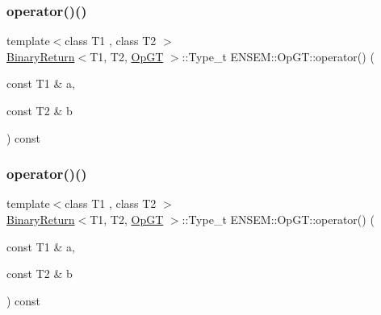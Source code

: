\subsubsection{\texorpdfstring{operator()()}{operator()()}\hspace{0.1cm}{\footnotesize\ttfamily [1/3]}}
{\footnotesize\ttfamily template$<$class T1 , class T2 $>$ \\
\mbox{\hyperlink{structENSEM_1_1BinaryReturn}{Binary\+Return}}$<$T1, T2, \mbox{\hyperlink{structENSEM_1_1OpGT}{Op\+GT}} $>$\+::Type\+\_\+t E\+N\+S\+E\+M\+::\+Op\+G\+T\+::operator() (\begin{DoxyParamCaption}\item[{const T1 \&}]{a,  }\item[{const T2 \&}]{b }\end{DoxyParamCaption}) const\hspace{0.3cm}{\ttfamily [inline]}}

\mbox{\label{structENSEM_1_1OpGT_acc420fbf856bae16d2db09a4c622ff4f}} 
\subsubsection{\texorpdfstring{operator()()}{operator()()}\hspace{0.1cm}{\footnotesize\ttfamily [2/3]}}
{\footnotesize\ttfamily template$<$class T1 , class T2 $>$ \\
\mbox{\hyperlink{structENSEM_1_1BinaryReturn}{Binary\+Return}}$<$T1, T2, \mbox{\hyperlink{structENSEM_1_1OpGT}{Op\+GT}} $>$\+::Type\+\_\+t E\+N\+S\+E\+M\+::\+Op\+G\+T\+::operator() (\begin{DoxyParamCaption}\item[{const T1 \&}]{a,  }\item[{const T2 \&}]{b }\end{DoxyParamCaption}) const\hspace{0.3cm}{\ttfamily [inline]}}

\mbox{\label{structENSEM_1_1OpGT_acc420fbf856bae16d2db09a4c622ff4f}} 

